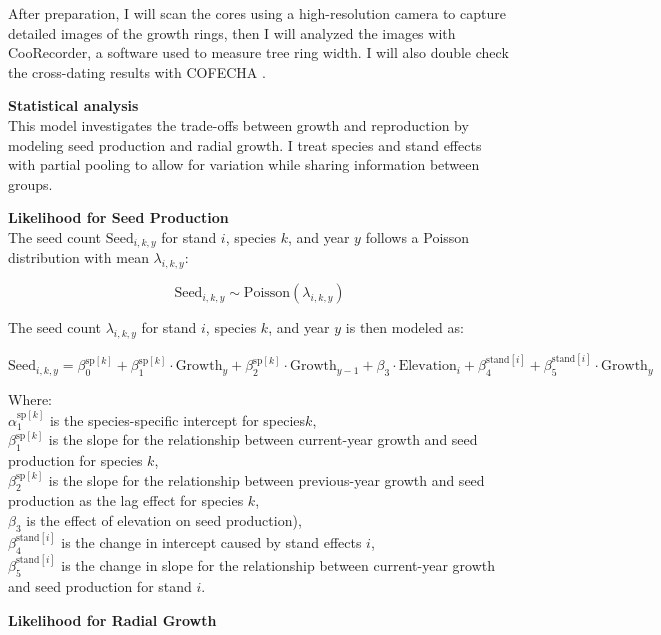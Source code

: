\documentclass[11pt,letter]{article}
\begin{document}
After preparation, I will scan the cores using a high-resolution camera to capture detailed images of the growth rings, then I will analyzed the images with CooRecorder, a software used to measure tree ring width. I will also double check the cross-dating results with COFECHA \cite{cook2013methods, speer2010fundamentals}.\par
\textbf{Statistical analysis}\\
This model investigates the trade-offs between growth and reproduction by modeling seed production and radial growth. I treat species and stand effects with partial pooling to allow for variation while sharing information between groups.\par
\textbf{Likelihood for Seed Production}\\

The seed count \(\text{Seed}_{i,k,y}\) for stand \(i\), species \(k\), and year \(y\) follows a Poisson distribution with mean \(\lambda_{i,k,y}\):

\[
\text{Seed}_{i,k,y} \sim \text{Poisson}(\lambda_{i,k,y})
\]

The seed count \(\lambda_{i,k,y}\) for stand \(i\), species \(k\), and year \(y\) is then modeled as:

\[
\text{Seed}_{i,k,y} = \beta_0^{\text{sp}[k]} + \beta_1^{\text{sp}[k]} \cdot \text{Growth}_y + \beta_2^{\text{sp}[k]} \cdot \text{Growth}_{y-1} + \beta_3 \cdot \text{Elevation}_i + \beta_4^{\text{stand}[i]} + \beta_5^{\text{stand}[i]} \cdot \text{Growth}_y
\]

Where:\\
\(\alpha_1^{\text{sp}[k]}\) is the species-specific intercept for species\(k\),\\
\(\beta_1^{\text{sp}[k]}\) is the slope for the relationship between current-year growth and seed production for species \(k\),\\
\(\beta_2^{\text{sp}[k]}\) is the slope for the relationship between previous-year growth and seed production as the lag effect for species \(k\),\\
\(\beta_3\) is the effect of elevation on seed production),\\
\(\beta_4^{\text{stand}[i]}\) is the change in intercept caused by stand effects \(i\),\\
\(\beta_5^{\text{stand}[i]}\) is the change in slope for the relationship between current-year growth and seed production for stand \(i\).

\textbf{Likelihood for Radial Growth}
\end{document}
